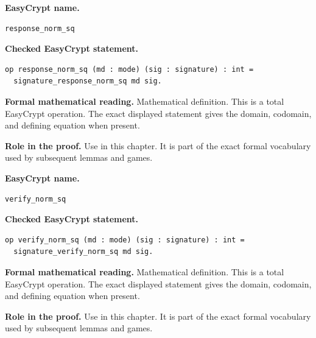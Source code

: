 \begin{formaldefinition}
\noindent\textbf{EasyCrypt name.}
\begin{lstlisting}[language=EasyCrypt,basicstyle=\ttfamily\scriptsize]
response_norm_sq
\end{lstlisting}
\noindent\textbf{Checked EasyCrypt statement.}
\begin{lstlisting}[language=EasyCrypt,basicstyle=\ttfamily\scriptsize]
op response_norm_sq (md : mode) (sig : signature) : int =
  signature_response_norm_sq md sig.
\end{lstlisting}
\noindent\textbf{Formal mathematical reading.}
Mathematical definition. This is a total EasyCrypt operation.  The exact displayed statement gives the domain, codomain, and defining equation when present.

\noindent\textbf{Role in the proof.}
Use in this chapter. It is part of the exact formal vocabulary used by subsequent lemmas and games.

\end{formaldefinition}

\begin{formaldefinition}
\noindent\textbf{EasyCrypt name.}
\begin{lstlisting}[language=EasyCrypt,basicstyle=\ttfamily\scriptsize]
verify_norm_sq
\end{lstlisting}
\noindent\textbf{Checked EasyCrypt statement.}
\begin{lstlisting}[language=EasyCrypt,basicstyle=\ttfamily\scriptsize]
op verify_norm_sq (md : mode) (sig : signature) : int =
  signature_verify_norm_sq md sig.
\end{lstlisting}
\noindent\textbf{Formal mathematical reading.}
Mathematical definition. This is a total EasyCrypt operation.  The exact displayed statement gives the domain, codomain, and defining equation when present.

\noindent\textbf{Role in the proof.}
Use in this chapter. It is part of the exact formal vocabulary used by subsequent lemmas and games.

\end{formaldefinition}

